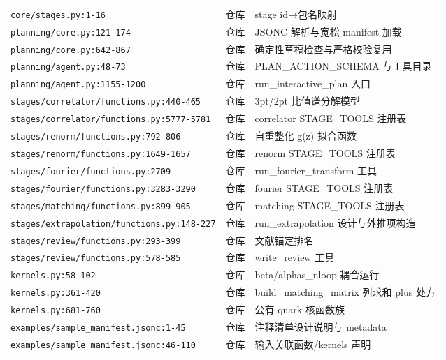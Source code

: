 \documentclass[UTF8]{ctexart}
\begin{document}
\begin{xltabular}{\textwidth}{llX}
\texttt{\nolinkurl{core/stages.py:1-16}} & 仓库 & stage id→包名映射\\
\texttt{\nolinkurl{planning/core.py:121-174}} & 仓库 & JSONC 解析与宽松 manifest 加载\\
\texttt{\nolinkurl{planning/core.py:642-867}} & 仓库 & 确定性草稿检查与严格校验复用\\
\texttt{\nolinkurl{planning/agent.py:48-73}} & 仓库 & PLAN\_ACTION\_SCHEMA 与工具目录\\
\texttt{\nolinkurl{planning/agent.py:1155-1200}} & 仓库 & run\_interactive\_plan 入口\\
\texttt{\nolinkurl{stages/correlator/functions.py:440-465}} & 仓库 & 3pt/2pt 比值谱分解模型\\
\texttt{\nolinkurl{stages/correlator/functions.py:5777-5781}} & 仓库 & correlator STAGE\_TOOLS 注册表\\
\texttt{\nolinkurl{stages/renorm/functions.py:792-806}} & 仓库 & 自重整化 g(z) 拟合函数\\
\texttt{\nolinkurl{stages/renorm/functions.py:1649-1657}} & 仓库 & renorm STAGE\_TOOLS 注册表\\
\texttt{\nolinkurl{stages/fourier/functions.py:2709}} & 仓库 & run\_fourier\_transform 工具\\
\texttt{\nolinkurl{stages/fourier/functions.py:3283-3290}} & 仓库 & fourier STAGE\_TOOLS 注册表\\
\texttt{\nolinkurl{stages/matching/functions.py:899-905}} & 仓库 & matching STAGE\_TOOLS 注册表\\
\texttt{\nolinkurl{stages/extrapolation/functions.py:148-227}} & 仓库 & run\_extrapolation 设计与外推项构造\\
\texttt{\nolinkurl{stages/review/functions.py:293-399}} & 仓库 & 文献锚定排名\\
\texttt{\nolinkurl{stages/review/functions.py:578-585}} & 仓库 & write\_review 工具\\
\texttt{\nolinkurl{kernels.py:58-102}} & 仓库 & beta/alphas\_nloop 耦合运行\\
\texttt{\nolinkurl{kernels.py:361-420}} & 仓库 & build\_matching\_matrix 列求和 plus 处方\\
\texttt{\nolinkurl{kernels.py:681-760}} & 仓库 & 公有 quark 核函数族\\
\texttt{\nolinkurl{examples/sample_manifest.jsonc:1-45}} & 仓库 & 注释清单设计说明与 metadata\\
\texttt{\nolinkurl{examples/sample_manifest.jsonc:46-110}} & 仓库 & 输入关联函数/kernels 声明\\

\end{xltabular}
\end{document}
